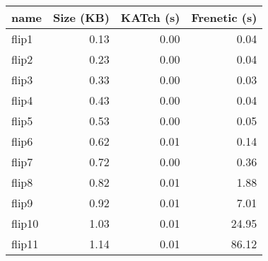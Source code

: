 \begin{tabular}{lrrr}
\toprule
name & Size (KB) & KATch (s) & Frenetic (s) \\
\midrule
flip1 & 0.13 & 0.00 & 0.04 \\
flip2 & 0.23 & 0.00 & 0.04 \\
flip3 & 0.33 & 0.00 & 0.03 \\
flip4 & 0.43 & 0.00 & 0.04 \\
flip5 & 0.53 & 0.00 & 0.05 \\
flip6 & 0.62 & 0.01 & 0.14 \\
flip7 & 0.72 & 0.00 & 0.36 \\
flip8 & 0.82 & 0.01 & 1.88 \\
flip9 & 0.92 & 0.01 & 7.01 \\
flip10 & 1.03 & 0.01 & 24.95 \\
flip11 & 1.14 & 0.01 & 86.12 \\
\bottomrule
\end{tabular}
